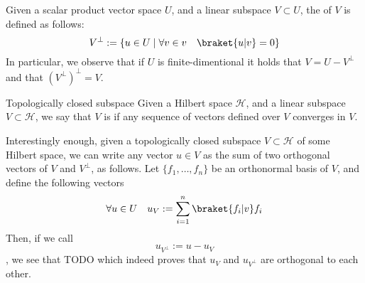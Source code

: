 \documentclass[a4paper, 12pt]{report}
\begin{document}
Given a scalar product vector space $U$, and a linear subspace $V \subset U$, the  of $V$ is defined as follows: $$V^\bot := \{u \in U \mid \forall v \in v \quad \braket{u|v} = 0\}$$ In particular, we observe that if $U$ is finite-dimentional it holds that $V = U - V^\bot$ and that $(V^\bot)^\bot = V$.

\begin{frameddefn}{Topologically closed subspace}
    Given a Hilbert space $\mathcal H$, and a linear subspace $V \subset \mathcal H$, we say that $V$ is  if any sequence of vectors defined over $V$ converges in $V$.
\end{frameddefn}

Interestingly enough, given a topologically closed subspace $V \subset \mathcal H$ of some Hilbert space, we can write any vector $u \in V$ as the sum of two orthogonal vectors of $V$ and $V^\bot$, as follows. Let $\{f_1, \ldots, f_n\}$ be an orthonormal basis of $V$, and define the following vectors $$\forall u \in U \quad u_V := \sum_{i = 1}^n{\braket{f_i|v} f_i}$$ Then, if we call $$u_{V^\bot} := u - u_V$$, we see that
TODO  which indeed proves that $u_V$ and $u_{V^\bot}$ are orthogonal to each other.
\end{document}
